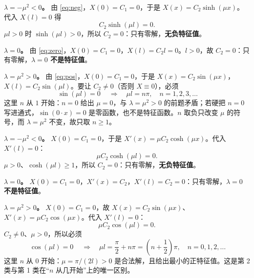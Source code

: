 \documentclass[11pt]{ctexart}
\let\origsubhdr\subhdr
\renewcommand{\subhdr}[1]{\needspace{3\baselineskip}\origsubhdr{#1}}
\begin{document}

\textbf{$\lambda=-\mu^2<0$。} 由 \eqref{eq:neg}，$X(0)=C_1=0$，于是 $X(x)=C_2\sinh(\mu x)$。代入 $X(l)=0$ 得
\[
C_2\sinh(\mu l)=0 .
\]
$\mu l>0$ 时 $\sinh(\mu l)>0$，所以 $C_2=0$：只有零解，\textbf{无负特征值}。

\textbf{$\lambda=0$。} 由 \eqref{eq:zero}，$X(0)=C_1=0$，$X(l)=C_2l=0$。$l>0$，故 $C_2=0$：只有零解，\textbf{$\lambda=0$ 不是特征值}。

\textbf{$\lambda=\mu^2>0$。} 由 \eqref{eq:pos}，$X(0)=C_1=0$，于是 $X(x)=C_2\sin(\mu x)$，$X(l)=C_2\sin(\mu l)$。要让 $C_2\ne0$（否则 $X\equiv0$），必须
\[
\boxed{\ \sin(\mu l)=0\ }
\quad\Longrightarrow\quad
\mu l=n\pi,\quad n=1,2,3,\dots
\]
这里 $n$ 从 $1$ 开始：$n=0$ 给出 $\mu=0$，与 $\lambda=\mu^2>0$ 的前题矛盾；若硬把 $n=0$ 写进通式，$\sin(0\cdot x)=0$ 是零函数，也不是特征函数。$n$ 取负只改变 $\mu$ 的符号，而 $\lambda=\mu^2$ 不变，故只取 $n\ge1$。



\textbf{$\lambda=-\mu^2<0$。} $X(0)=C_1=0$，于是 $X'(x)=\mu C_2\cosh(\mu x)$。代入 $X'(l)=0$：
\[
\mu C_2\cosh(\mu l)=0 .
\]
$\mu>0$、$\cosh(\mu l)\ge1$，所以 $C_2=0$：只有零解，\textbf{无负特征值}。

\textbf{$\lambda=0$。} $X(0)=C_1=0$，$X'(x)=C_2$，$X'(l)=C_2=0$：只有零解，\textbf{$\lambda=0$ 不是特征值}。

\textbf{$\lambda=\mu^2>0$。} $X(0)=C_1=0$，故 $X(x)=C_2\sin(\mu x)$、$X'(x)=\mu C_2\cos(\mu x)$。代入 $X'(l)=0$：
\[
\mu C_2\cos(\mu l)=0 .
\]
$C_2\ne0$、$\mu>0$，所以必须
\[
\boxed{\ \cos(\mu l)=0\ }
\quad\Longrightarrow\quad
\mu l=\frac{\pi}{2}+n\pi=\left(n+\frac12\right)\pi,\quad n=0,1,2,\dots
\]
这里 $n$ 从 $0$ 开始：$\mu=\pi/(2l)>0$ 是合法解，且给出最小的正特征值。这是第 2 类与第 1 类在“$n$ 从几开始”上的唯一区别。


\end{document}
